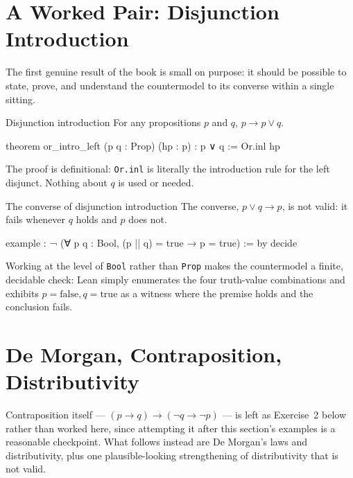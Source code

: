 \section{A Worked Pair: Disjunction Introduction}

The first genuine result of the book is small on purpose: it should
be possible to state, prove, and understand the countermodel to its
converse within a single sitting.

\begin{experiment}{Disjunction introduction}
For any propositions $p$ and $q$, $p \to p \lor q$.
\begin{lean}
theorem or_intro_left (p q : Prop) (hp : p) : p ∨ q :=
  Or.inl hp
\end{lean}
The proof is definitional: \texttt{Or.inl} is literally the
introduction rule for the left disjunct. Nothing about $q$ is used
or needed.
\end{experiment}

\begin{countermodel}{The converse of disjunction introduction}
The converse, $p \lor q \to p$, is not valid: it fails whenever $q$
holds and $p$ does not.
\begin{lean}
example : ¬ (∀ p q : Bool, (p || q) = true → p = true) := by
  decide
\end{lean}
Working at the level of \texttt{Bool} rather than \texttt{Prop}
makes the countermodel a finite, decidable check: Lean simply
enumerates the four truth-value combinations and exhibits
$p = \mathrm{false}, q = \mathrm{true}$ as a witness where the
premise holds and the conclusion fails.
\end{countermodel}

\section{De Morgan, Contraposition, Distributivity}

Contraposition itself — $(p \to q) \to (\lnot q \to \lnot p)$ — is
left as Exercise~2 below rather than worked here, since attempting
it after this section's examples is a reasonable checkpoint. What
follows instead are De Morgan's laws and distributivity, plus one
plausible-looking strengthening of distributivity that is not valid.

